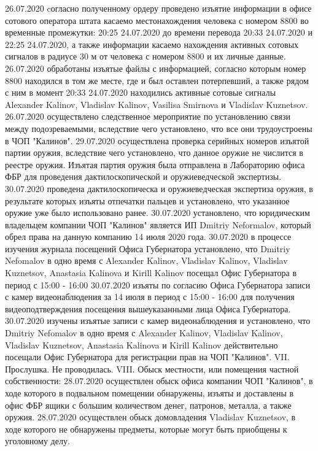 26.07.2020 cогласно полученному ордеру проведено изъятие информации в офисе сотового оператора штата касаемо местонахождения человека с номером 8800 во временные промежутки: 20:25 24.07.2020 до времени перевода 20:33 24.07.2020 и 22:25 24.07.2020, а также информации касаемо нахождения активных сотовых сигналов в радиусе 30 м от человека с номером 8800 и их личные данные.
26.07.2020 обработаны изъятые файлы с информацией, согласно которым номер 8800 находился в том же месте, где и был оставлен потерпевший, а также рядом с ним в момент 20:33 24.07.2020 находились активные сотовые сигналы Alexander Kalinov, Vladislav Kalinov, Vasilisa Smirnova и Vladislav Kuznetsov.
26.07.2020 осуществлено следственное мероприятие по установлению связи между подозреваемыми, вследствие чего установлено, что все они трудоустроены в ЧОП "Калинов".
29.07.2020 осуществлена проверка серийных номеров изъятой партии оружия, вследствие чего установлено, что данное оружие не числится в реестре оружия. Изъятая партия оружия была отправлена в Лабораторию офиса ФБР для проведения дактилоскопической и оружиеведческой экспертизы.
30.07.2020 проведена дактилоскопическа и оружиеведческая экспертиза оружия, в результате которых изъяты отпечатки пальцев и установлено, что указанное оружие уже было использовано ранее.
30.07.2020 установлено, что юридическим владельцем компании ЧОП "Калинов" является ИП Dmitriy Neformalov, который обрел права на данную компанию 14 июля 2020 года.
30.07.2020 в процессе изучения журнала посещений Офиса Губернатора установлено, что Dmitriy Nefomalov в одно время с Alexander Kalinov, Vladislav Kalinov, Vladislav Kuznetsov, Anastasia Kalinova и Kirill Kalinov посещал Офис Губернатора в период с 15:00 - 16:00
30.07.2020 изъяты по согласию Офиса Губернатора записи с камер видеонаблюдения за 14 июля в период с 15:00 - 16:00 для получения видеоподтверждения посещения вышеуказанными лица Офиса Губернатора.
30.07.2020 изучены изъятые записи с камер видеонаблюдения и установлено, что Dmitriy Nefomalov в одно время с Alexander Kalinov, Vladislav Kalinov, Vladislav Kuznetsov, Anastasia Kalinova и Kirill Kalinov действительно посещали Офис Губернатора для регистрации прав на ЧОП "Калинов".
VII. Прослушка.	
Не проводилась.​
VIII. Обыск местности, или помещения частной собственности:	28.07.2020 осуществлен обыск офиса компании ЧОП "Калинов", в ходе которого в подвальном помещении обнаружены, изъяты и доставлены в офис ФБР ящики с большим количеством денег, патронов, металла, а также оружия.
28.07.2020 осуществлен обыск домовладения Vladislav Kuznetsov, в ходе которого не обнаружены предметы, которые могут быть приобщены к уголовному делу.
